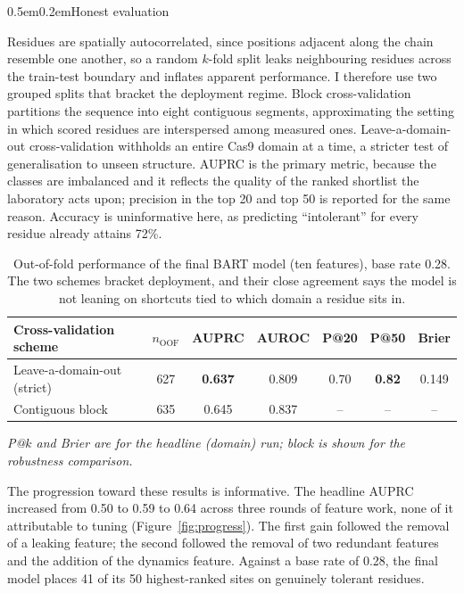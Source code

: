 \documentclass[10pt]{article}
\makeatletter
\renewcommand\section{\@startsection{section}{1}{0pt}%
  {0.5em}{0.2em}{\normalsize\bfseries}}
\makeatother
\begin{document}
\section{Honest evaluation}

Residues are spatially autocorrelated, since positions adjacent along the chain resemble one
another, so a random $k$-fold split leaks neighbouring residues across the train-test boundary and
inflates apparent performance. I therefore use two grouped splits that bracket the deployment
regime. Block cross-validation partitions the sequence into eight contiguous segments,
approximating the setting in which scored residues are interspersed among measured ones.
Leave-a-domain-out cross-validation withholds an entire Cas9 domain at a time, a stricter test of
generalisation to unseen structure. AUPRC is the primary metric, because the classes are imbalanced
and it reflects the quality of the ranked shortlist the laboratory acts upon; precision in the top
20 and top 50 is reported for the same reason. Accuracy is uninformative here, as predicting
``intolerant'' for every residue already attains 72\%.

\begin{table}[h]
\centering
\caption{Out-of-fold performance of the final BART model (ten features), base rate 0.28. The two
schemes bracket deployment, and their close agreement says the model is not leaning on shortcuts
tied to which domain a residue sits in.}
\label{tab:perf}
\begin{tabular}{lcccccc}
\toprule
Cross-validation scheme & $n_{\text{OOF}}$ & AUPRC & AUROC & P@20 & P@50 & Brier \\
\midrule
Leave-a-domain-out (strict) & 627 & \textbf{0.637} & 0.809 & 0.70 & \textbf{0.82} & 0.149 \\
Contiguous block            & 635 & 0.645 & 0.837 & --   & --   & --    \\
\bottomrule
\end{tabular}

{\footnotesize\itshape P@$k$ and Brier are for the headline (domain) run; block is shown for the
robustness comparison.}
\end{table}

The progression toward these results is informative. The headline AUPRC increased from 0.50 to
0.59 to 0.64 across three rounds of feature work, none of it attributable to tuning
(Figure~\ref{fig:progress}). The first gain followed the removal of a leaking feature; the second
followed the removal of two redundant features and the addition of the dynamics feature. Against a
base rate of 0.28, the final model places 41 of its 50 highest-ranked sites on genuinely tolerant
residues.
\end{document}
